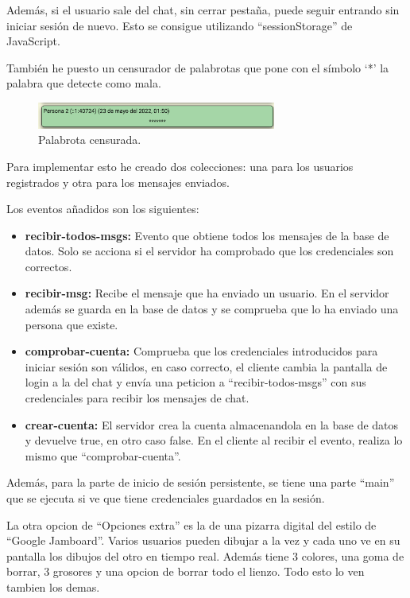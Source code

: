 \documentclass{article}
\begin{document}
Además, si el usuario sale del chat, sin cerrar pestaña, puede seguir entrando sin iniciar sesión de nuevo. Esto se consigue utilizando ``sessionStorage'' de JavaScript.

También he puesto un censurador de palabrotas que pone con el símbolo `*' la palabra que detecte como mala.

\begin{figure}[H]
    \centering
    \includegraphics[width=0.7\textwidth]{images/censura.png}
    \caption{Palabrota censurada.}
\end{figure}

Para implementar esto he creado dos colecciones: una para los usuarios registrados y otra para los mensajes enviados.

Los eventos añadidos son los siguientes:

\begin{itemize}
    \item \textbf{recibir-todos-msgs: }Evento que obtiene todos los mensajes de la base de datos. Solo se acciona si el servidor ha comprobado que los credenciales son correctos.
    \item \textbf{recibir-msg: }Recibe el mensaje que ha enviado un usuario. En el servidor además se guarda en la base de datos y se comprueba que lo ha enviado una persona que existe.
    \item \textbf{comprobar-cuenta: }Comprueba que los credenciales introducidos para iniciar sesión son válidos, en caso correcto, el cliente cambia la pantalla de login a la del chat y envía una peticion a ``recibir-todos-msgs'' con sus credenciales para recibir los mensajes de chat.
    \item \textbf{crear-cuenta: }El servidor crea la cuenta almacenandola en la base de datos y devuelve true, en otro caso false. En el cliente al recibir el evento, realiza lo mismo que ``comprobar-cuenta''.
\end{itemize}    

Además, para la parte de inicio de sesión persistente, se tiene una parte ``main'' que se ejecuta si ve que tiene credenciales guardados en la sesión.


La otra opcion de ``Opciones extra'' es la de una pizarra digital del estilo de ``Google Jamboard''. Varios usuarios pueden dibujar a la vez y cada uno ve en su pantalla los dibujos del otro en tiempo real. Además tiene 3 colores, una goma de borrar, 3 grosores y una opcion de borrar todo el lienzo. Todo esto lo ven tambien los demas.
\end{document}
